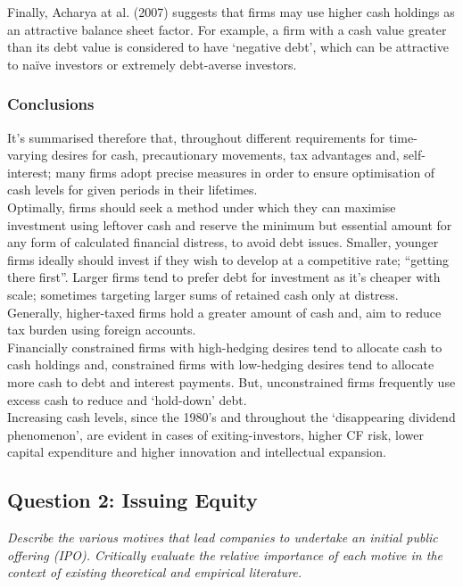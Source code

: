 \documentclass[11pt, english]{article}
\begin{document}
	Finally, Acharya at al. (2007) suggests that firms may use higher cash holdings as an attractive balance sheet factor. For example, a firm with a cash value greater than its debt value is considered to have ‘negative debt’, which can be attractive to naïve investors or extremely debt-averse investors.

		\subsubsection*{Conclusions}

	It’s summarised therefore that, throughout different requirements for time- varying desires for cash, precautionary movements, tax advantages and, self- interest; many firms adopt precise measures in order to ensure optimisation of cash levels for given periods in their lifetimes.\\

	Optimally, firms should seek a method under which they can maximise investment using leftover cash and reserve the minimum but essential amount for any form of calculated financial distress, to avoid debt issues. Smaller, younger firms ideally should invest if they wish to develop at a competitive rate; “getting there first”. Larger firms tend to prefer debt for investment as it’s cheaper with scale; sometimes targeting larger sums of retained cash only at distress. Generally, higher-taxed firms hold a greater amount of cash and, aim to reduce tax burden using foreign accounts.\\

	Financially constrained firms with high-hedging desires tend to allocate cash to cash holdings and, constrained firms with low-hedging desires tend to allocate more cash to debt and interest payments. But, unconstrained firms frequently use excess cash to reduce and ‘hold-down’ debt.\\

	Increasing cash levels, since the 1980’s and throughout the ‘disappearing dividend phenomenon’, are evident in cases of exiting-investors, higher CF risk, lower capital expenditure and higher innovation and intellectual expansion.

	\newpage

	\subsection{Question 2: Issuing Equity}

	\textit{Describe the various motives that lead companies to undertake an initial public offering (IPO). Critically evaluate the relative importance of each motive in the context of existing theoretical and empirical literature.}
\end{document}
